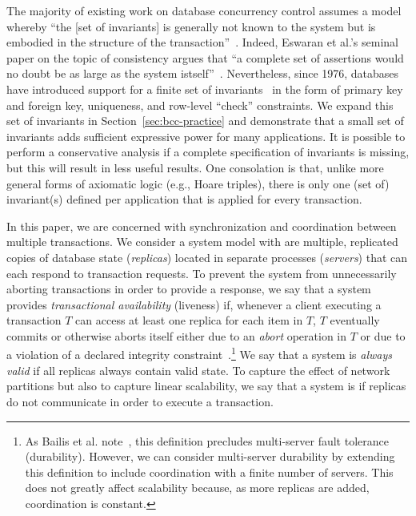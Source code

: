  The majority of existing work
on database concurrency control assumes a model whereby ``the [set of
  invariants] is generally not known to the system but is embodied in
the structure of the transaction''~\cite{traiger-tods}. Indeed,
Eswaran et al.'s seminal paper on the topic of consistency argues that
``a complete set of assertions would no doubt be as large as the
system istself''~\cite{eswaran-consistency}. Nevertheless, since 1976,
databases have introduced support for a finite set of
invariants~\cite{korth-serializability} in the form of primary key and
foreign key, uniqueness, and row-level ``check'' constraints. We
expand this set of invariants in Section~\ref{sec:bcc-practice} and
demonstrate that a small set of invariants adds sufficient expressive
power for many applications. It is possible to perform a conservative
analysis if a complete specification of invariants is missing, but
this will result in less useful results. One consolation is that,
unlike more general forms of axiomatic logic (e.g., Hoare triples),
there is only one (set of) invariant(s) defined per application that
is applied for every transaction.\vspace{.5em}

 In this paper, we are concerned with
synchronization and coordination between multiple transactions. We
consider a system model with are multiple, replicated copies of
database state (\textit{replicas}) located in separate processes
(\textit{servers}) that can each respond to transaction requests.  To
prevent the system from unnecessarily aborting transactions in order
to provide a response, we say that a system provides
\textit{transactional availability} (liveness) if, whenever a client
executing a transaction $T$ can access at least one replica for each
item in $T$, $T$ eventually commits or otherwise aborts itself either
due to an \textit{abort} operation in $T$ or due to a violation of a
declared integrity constraint~\cite{hat-vldb}.\footnote{As Bailis et
  al. note~\cite{hat-vldb}, this definition precludes multi-server
  fault tolerance (durability). However, we can consider multi-server
  durability by extending this definition to include coordination with
  a finite number of servers. This does not greatly affect scalability
  because, as more replicas are added, coordination is constant.} We
say that a system is \textit{always valid} if all replicas always
contain valid state. To capture the effect of network partitions but
also to capture linear scalability, we say that a system is
\textit{\cfree} if replicas do not communicate in order to execute a
transaction.

